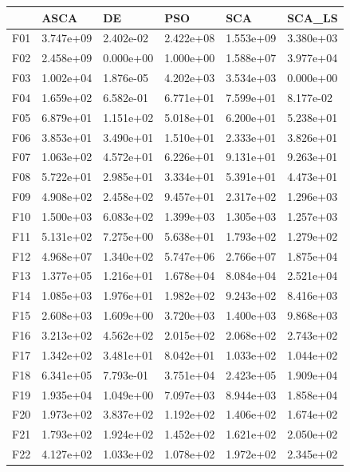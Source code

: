 \begin{tabular}{llllll}
\toprule
{} &       ASCA &         DE &        PSO &        SCA &     SCA\_LS \\
\midrule
F01  &  3.747e+09 &  2.402e-02 &  2.422e+08 &  1.553e+09 &  3.380e+03 \\
F02  &  2.458e+09 &  0.000e+00 &  1.000e+00 &  1.588e+07 &  3.977e+04 \\
F03  &  1.002e+04 &  1.876e-05 &  4.202e+03 &  3.534e+03 &  0.000e+00 \\
F04  &  1.659e+02 &  6.582e-01 &  6.771e+01 &  7.599e+01 &  8.177e-02 \\
F05  &  6.879e+01 &  1.151e+02 &  5.018e+01 &  6.200e+01 &  5.238e+01 \\
F06  &  3.853e+01 &  3.490e+01 &  1.510e+01 &  2.333e+01 &  3.826e+01 \\
F07  &  1.063e+02 &  4.572e+01 &  6.226e+01 &  9.131e+01 &  9.263e+01 \\
F08  &  5.722e+01 &  2.985e+01 &  3.334e+01 &  5.391e+01 &  4.473e+01 \\
F09  &  4.908e+02 &  2.458e+02 &  9.457e+01 &  2.317e+02 &  1.296e+03 \\
F10  &  1.500e+03 &  6.083e+02 &  1.399e+03 &  1.305e+03 &  1.257e+03 \\
F11  &  5.131e+02 &  7.275e+00 &  5.638e+01 &  1.793e+02 &  1.279e+02 \\
F12  &  4.968e+07 &  1.340e+02 &  5.747e+06 &  2.766e+07 &  1.875e+04 \\
F13  &  1.377e+05 &  1.216e+01 &  1.678e+04 &  8.084e+04 &  2.521e+04 \\
F14  &  1.085e+03 &  1.976e+01 &  1.982e+02 &  9.243e+02 &  8.416e+03 \\
F15  &  2.608e+03 &  1.609e+00 &  3.720e+03 &  1.400e+03 &  9.868e+03 \\
F16  &  3.213e+02 &  4.562e+02 &  2.015e+02 &  2.068e+02 &  2.743e+02 \\
F17  &  1.342e+02 &  3.481e+01 &  8.042e+01 &  1.033e+02 &  1.044e+02 \\
F18  &  6.341e+05 &  7.793e-01 &  3.751e+04 &  2.423e+05 &  1.909e+04 \\
F19  &  1.935e+04 &  1.049e+00 &  7.097e+03 &  8.944e+03 &  1.858e+04 \\
F20  &  1.973e+02 &  3.837e+02 &  1.192e+02 &  1.406e+02 &  1.674e+02 \\
F21  &  1.793e+02 &  1.924e+02 &  1.452e+02 &  1.621e+02 &  2.050e+02 \\
F22  &  4.127e+02 &  1.033e+02 &  1.078e+02 &  1.972e+02 &  2.345e+02 \\

\end{tabular}
